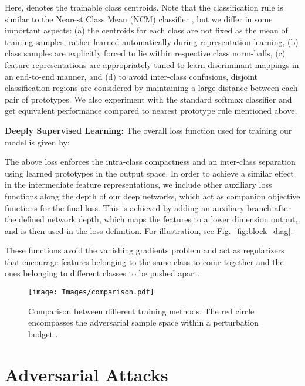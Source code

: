 \documentclass[10pt,twocolumn,letterpaper]{article}
\begin{document}
Here,  denotes the trainable class centroids. Note that the classification rule is similar to the Nearest Class Mean (NCM) classifier \cite{mensink2013distance}, but we differ in some important aspects: (a) the centroids for each class are not fixed as the mean of training samples, rather learned automatically during representation learning, (b) class samples are explicitly forced to lie within respective class norm-balls, (c) feature representations are appropriately tuned to learn discriminant mappings in an end-to-end manner, and (d) to avoid inter-class confusions, disjoint classification regions are considered by maintaining a large distance between each pair of prototypes. We also experiment with the standard softmax classifier and get equivalent performance compared to nearest prototype rule mentioned above.



\noindent \textbf{Deeply Supervised Learning:} 
The overall loss function used for training our model is given by:

The above loss enforces the intra-class compactness and an inter-class separation using learned prototypes in the output space. In order to achieve a similar effect in the intermediate feature representations, we include other auxiliary loss functions  along the depth of our deep networks, which act as companion objective functions for the final loss. This is achieved by adding an auxiliary branch  after the defined network depth, which maps the features to a lower dimension output, and is then used in the loss definition. For illustration, see Fig.~\ref{fig:block_diag}.

These functions avoid the vanishing gradients problem and act as regularizers that encourage features belonging to the same class to come together and the ones belonging to different classes to be pushed apart. 

\begin{figure}[t] 
    \centering
   {\texttt{[image: Images/comparison.pdf]}}\vspace{-0.5em}
    \caption{\small{Comparison between different training methods. The red circle encompasses the adversarial sample space within a perturbation budget .}} \vspace{-1.25em}
    \label{fig:toy-fig}
\end{figure}

\section{Adversarial Attacks}
\label{subsec:attacks}
\end{document}
